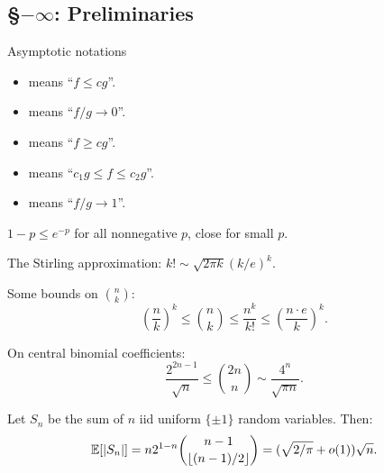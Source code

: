 \documentclass[11pt]{article}
\begin{document}
\begin{prelims}
\section*{\S$-\infty$: Preliminaries}
\begin{itemise}
\item Asymptotic notations
\begin{itemize}\squishlist
\item {} means ``$f\leq cg$''.
\item {} means ``$f/g\to0$''.
\item {} means ``$f\geq cg$''.
\item {} means ``$c_1 g\leq f\leq c_2 g$''.
\item {} means ``$f/g\to1$''.
\end{itemize}
\item $1-p\leq e^{-p}$ for all nonnegative $p$, close for small $p$.
\item The Stirling approximation: $k!\sim \sqrt{2\pi k}(k/e)^k$.
\item Some bounds on ${n\choose k}$:
\[\left(\frac{n}{k}\right)^k\leq {n\choose k}\leq\frac{n^k}{k!}\leq\left(\frac{n\cdot e}{k}\right)^k.\]
\item On central binomial coefficients:
\[\frac{2^{2n-1}}{\sqrt n}\leq {2n\choose n}\sim\frac{4^n}{\sqrt{\pi n}}.\]
\item Let $S_n$ be the sum of $n$ iid uniform $\{\pm1\}$ random variables. Then:
\[\operatorname{\mathbb{E}}[|S_n|]=n2^{1-n}{n-1\choose\lfloor(n-1)/2\rfloor}=(\sqrt{2/\pi}+o(1))\sqrt n.\]
\end{itemise}
\end{prelims}
\end{document}

